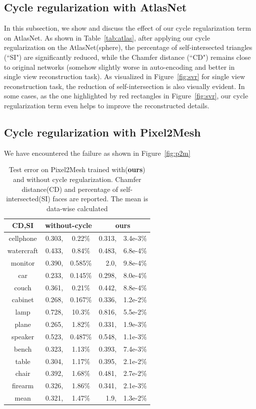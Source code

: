 \subsection{Cycle regularization with AtlasNet}
In this subsection, we show and discuss the effect of our cycle regularization term on AtlasNet\cite{atlasnet}. As shown in Table~\ref{tab:atlas}, after applying our cycle regularization on the AtlasNet(sphere), the percentage of self-intersected triangles (``SI") are significantly reduced, while the Chamfer distance (``CD") remains close to original networks (somehow slightly worse in auto-encoding and better in single view reconstruction task). As visualized in Figure~\ref{fig:svr} for single view reconstruction task, the reduction of self-intersection is also visually evident. In some cases, as the one highlighted by red rectangles in Figure~\ref{fig:svr}, our cycle regularization term even helps to improve the reconstructed details.
\subsection{Cycle regularization with Pixel2Mesh}

We have encountered the failure as shown in Figure~\ref{fig:p2m}
 

\begin{table}
	\caption{Test error on Pixel2Mesh trained with(\textbf{ours}) and without cycle regularization. Chamfer distance(CD) and percentage of self-intersected(SI) faces are reported. The mean is data-wise calculated}
	\label{tab:p2m}
	\centering
	\begin{tabular}{c|rc|rc|}
		CD,SI& \multicolumn{2}{c|}{without-cycle} & \multicolumn{2}{c|}{ours}\\
		\hline
		cellphone&0.303,&0.22\%&0.313,&3.4e-3\%\\
		watercraft&0.433,&0.84\%&0.483,&6.8e-4\%\\
		monitor&0.390,&0.585\%&2.0,&9.8e-4\%\\
		car&0.233,&0.145\%&0.298,&8.0e-4\%\\
		couch&0.361,&0.21\%&0.442,&8.8e-4\%\\
		cabinet&0.268,&0.167\%&0.336,&1.2e-2\%\\
		lamp&0.728,&10.3\%&0.816,&5.5e-2\%\\
		plane&0.265,&1.82\%&0.331,&1.9e-3\%\\
		speaker&0.523,&0.487\%&0.548,&1.1e-3\%\\
		bench&0.323,&1.13\%&0.393,&7.4e-3\%\\
		table&0.304,&1.17\%&0.395,&2.1e-2\%\\
		chair&0.392,&1.68\%&0.481,&2.7e-2\%\\
		firearm&0.326,&1.86\%&0.341,&2.1e-3\%\\
		\hline
		mean &0.321,&1.47\%&1.9,& 1.3e-2\%\\
		
	\end{tabular}
\end{table}

